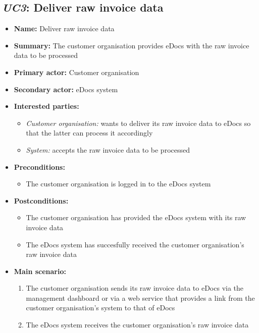 \documentclass[a4paper,10pt]{article}
\begin{document}
\subsection{\emph{UC3}: Deliver raw invoice data}
\begin{itemize}
    \item \textbf{Name:} Deliver raw invoice data
    \item \textbf{Summary:} The customer organisation provides eDocs with the raw invoice data to be processed
    \item \textbf{Primary actor:} Customer organisation
    \item \textbf{Secondary actor:} eDocs system
    \item \textbf{Interested parties:} 
        \begin{itemize}
            \item \textit{Customer organisation:} wants to deliver its raw invoice data to eDocs so that the latter can process it accordingly
            \item \textit{System:} accepts the raw invoice data to be processed
        \end{itemize}
    \item \textbf{Preconditions:}
        \begin{itemize}
            \item The customer organisation is logged in to the eDocs system
        \end{itemize}
    \item \textbf{Postconditions:}
        \begin{itemize}
            \item The customer organisation has provided the eDocs system with its raw invoice data
            \item The eDocs system has succesfully received the customer organisation's raw invoice data
        \end{itemize}
        
    \item \textbf{Main scenario:} 
    \begin{enumerate}
       \item The customer organisation sends its raw invoice data to eDocs via the management dashboard or via a web service that provides a link from the customer organisation's system to that of eDocs
       \item The eDocs system receives the customer organisation's raw invoice data
    \end{enumerate}
\end{itemize}
\end{document}
